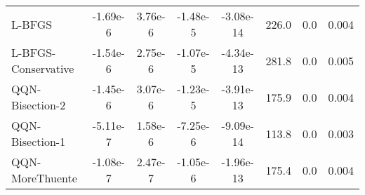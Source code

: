 \documentclass{article}
\begin{document}
\begin{table}[htbp]
{\begin{tabular}{l*{7}{S[table-format=2.2e-1]}}
L-BFGS & -1.69e-6 & 3.76e-6 & -1.48e-5 & -3.08e-14 & 226.0 & 0.0 & 0.004 \\
L-BFGS-Conservative & -1.54e-6 & 2.75e-6 & -1.07e-5 & -4.34e-13 & 281.8 & 0.0 & 0.005 \\
QQN-Bisection-2 & -1.45e-6 & 3.07e-6 & -1.23e-5 & -3.91e-13 & 175.9 & 0.0 & 0.004 \\
QQN-Bisection-1 & -5.11e-7 & 1.58e-6 & -7.25e-6 & -9.09e-14 & 113.8 & 0.0 & 0.003 \\
QQN-MoreThuente & -1.08e-7 & 2.47e-7 & -1.05e-6 & -1.96e-13 & 175.4 & 0.0 & 0.004 \\
\bottomrule
\end{tabular}
}
\end{table}
\end{document}
